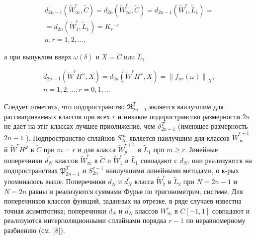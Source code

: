 \documentclass[10pt]{article}
\begin{document}
\[

\begin{gathered}

d_{2 n-1}\left(\tilde{W}_{\infty}^{r}, \tilde{C}\right)=d_{2 n}\left(\tilde{W}_{\infty}^{r}, \tilde{C}\right)=d_{2 n-1}\left(\tilde{W}_{1}^{r}, \tilde{L}_{1}\right)= \\

=d_{2 n}\left(\tilde{W}_{1}^{r}, \tilde{L}_{1}\right)=K_{r}{ }^{-r} \\

n, r=1,2, \ldots,

\end{gathered}

\]



а при выпуклом вверх $\omega(\delta)$ и $X=\tilde{C}$ или $\tilde{L}_{1}$



\[

\begin{gathered}

d_{2 n-1}\left(\tilde{W}^{r} H^{\omega}, X\right)=d_{2 n}\left(\tilde{W}^{r} H^{\omega}, X\right)=\left\|f_{n r}(\omega)\right\|_{X}, \\

n=1,2, \ldots ; r=0,1, \ldots

\end{gathered}

\]



Следует отметить, что подпространство $\Re_{2 n-1}^{T}$ является ваилучшим для рассматриваемых классов при всех $r$ и никакое подпространство размерности $2 n$ не дает на этіг классах лучшее приолижение, чем $\vartheta_{2 n-1}^{T}$ (имеющее размерность $2 n-1$ ). Подпространство сплайнов $S_{2 n}^{m}$ является наилучшим для классов $\tilde{W}_{\infty}^{r+1}$ й $\tilde{W}^{r} H^{\omega}$ в $\tilde{C}$ при $m=r$ и для класса $\tilde{W}_{p}^{r+1}$ в $\tilde{L}_{1}$ прп $m \geqslant r$. Јинейные поперечники $d_{N}^{\prime}$ классов $\tilde{W}_{\infty}^{r}$ в $\tilde{C}$ и $\tilde{W}_{1}^{r}$ в $\tilde{L_{1}}$ совпадают с $d_{N}$, они реализуются на подпространствах $\mathfrak{P}_{2 n-1}^{T}$ и $S_{2 n}^{r-1}$ наилучшими линейными методами, о к-рых упоминалось выше. Поперечники $d_{N}$ и $d_{N}^{\prime}$ класса $\tilde{W}_{2}^{r}$ в $\tilde{L}_{2}$ при $N=2 n-1$ и $N=2 n$ равны и реализуются суммами Фурье по тригонометрич. системе. Для поперечников классов функций, заданных на отрезке, в ряде случаев известна точная асимптотика; поперечники $d_{N}$ и $d_{N}^{\prime}$ классов $W_{\infty}^{r}$ в $C[-1,1]$ совпадают и реализуются интерполяционными сплайнами порядка $r-1$ по неравномерному разбиению (см. [8]).
\end{document}
